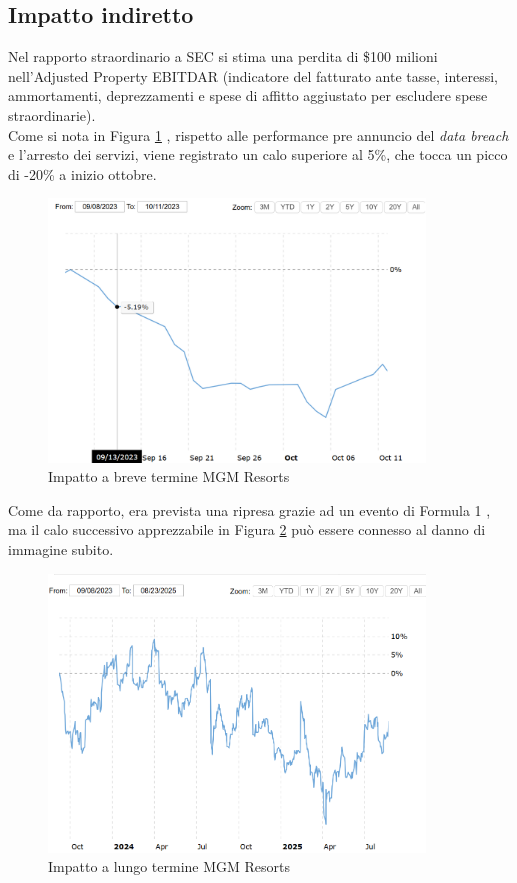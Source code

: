 \documentclass[12pt,a4paper,twoside]{report}
\begin{document}
\subsection{Impatto indiretto}
Nel rapporto straordinario a SEC si stima una perdita di  \$100 milioni nell'Adjusted Property EBITDAR (indicatore del fatturato ante tasse, interessi,  ammortamenti, deprezzamenti e spese di affitto aggiustato per escludere spese straordinarie).\\
Come si nota in Figura \ref{fig:mgm1} \cite{macrotrends_mgm}, rispetto alle performance pre annuncio del \textit{data breach} e l'arresto dei servizi, viene registrato un calo superiore al 5\%, che tocca un picco di -20\% a inizio ottobre.\\
\begin{figure}[H] 
\begin{center} 
\includegraphics[width=10cm]{figures/MGM_short.png} 
\caption[Grafico MGM Resorts short]{Impatto a breve termine MGM Resorts}\label{fig:mgm1}
\end{center}
\end{figure}

Come da rapporto, era prevista una ripresa grazie ad un evento di Formula 1 \cite{MGM_8k_2023}, ma il calo successivo apprezzabile in Figura \ref{fig:mgm2} \cite{macrotrends_mgm} pu\`o essere connesso al danno di immagine subito.\\

\begin{figure}[H] 
\begin{center} 
\includegraphics[width=10cm]{figures/MGM_long.png} 
\caption[Grafico MGM Resorts long]{Impatto a lungo termine  MGM Resorts}\label{fig:mgm2}
\end{center}
\end{figure}
\end{document}
